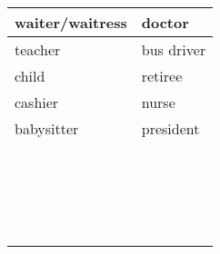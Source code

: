 \documentclass{article}
\date{}
\begin{document}
  \centering
  \noindent
  {\LARGE
    \begin{tabular}{| p{} | p{} |}
      \hline
      waiter/waitress  & doctor \\
      \hline
      teacher          & bus driver \\
      \hline
      child            & retiree \\
      \hline
      cashier          & nurse \\
      \hline
      babysitter       & president \\
      \hline
                       & \\
      \hline
                       & \\
      \hline
                       & \\
      \hline
                       & \\
      \hline
                       & \\
      \hline
                       & \\
      \hline
                       & \\
      \hline
                       & \\
      \hline
                       & \\
      \hline
                       & \\
      \hline
                       & \\
      \hline
                       & \\
      \hline
                       & \\
      \hline
                       & \\
      \hline
                       & \\
      \hline
                       & \\
      \hline
                       & \\
      \hline
                       & \\
      \hline
                       & \\
      \hline
    \end{tabular}
  }
\end{document}
